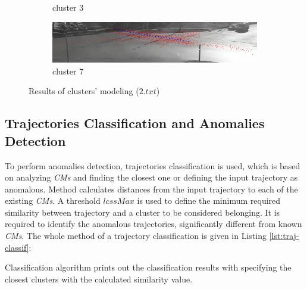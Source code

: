 \begin{figure}[!htb]
\begin{subfigure}[!htb]{0.7\textwidth}
		\caption{cluster 3}
	\end{subfigure}
	\hfill
	\begin{subfigure}[!htb]{0.7\textwidth}
		\centering{}
		\includegraphics[width=\textwidth]{images/cm-7-from-8-0_95.png}
		\caption{cluster 7}
	\end{subfigure}
	
	\caption{Results of clusters' modeling ($2.txt$)}
	\label{fig:cm-res}
\end{figure}

\subsection{Trajectories Classification and Anomalies Detection}

To perform anomalies detection, trajectories classification is used, which is based on analyzing \textit{CMs} and finding the closest one or defining the input trajectory as anomalous. Method calculates distances from the input trajectory to each of the existing \textit{CMs}. A threshold $lcssMax$ is used to define the minimum required similarity between trajectory and a cluster to be considered belonging. It is required to identify the anomalous trajectories, significantly different from known \textit{CMs}. The whole method of a trajectory classification is given in Listing \ref{lst:traj-classif}:



Classification algorithm prints out the classification results with specifying the closest clusters with the calculated similarity value.

